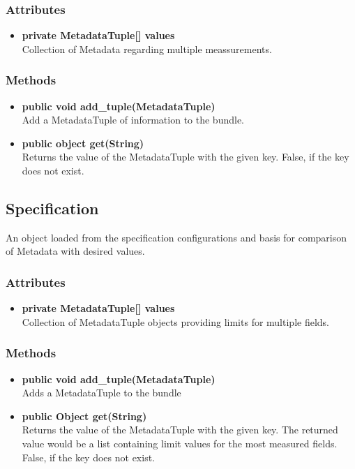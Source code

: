\subsubsection{Attributes}
\begin{itemize}
	\item \textbf{private MetadataTuple[] values}\\
	Collection of Metadata regarding multiple meassurements.
\end{itemize}
\subsubsection{Methods}
\begin{itemize}
	\item \textbf{public void add\_tuple(MetadataTuple)}\\
	Add a MetadataTuple of information to the bundle.
	\item \textbf{public object get(String)}\\
	Returns the value of the MetadataTuple with the given key. False, if the key does not exist.
\end{itemize}


\subsection{Specification}
An object loaded from the specification configurations and basis for comparison of Metadata with desired values.

\subsubsection{Attributes}
\begin{itemize}
	\item \textbf{private MetadataTuple[] values}\\
	Collection of MetadataTuple objects providing limits for multiple fields.
\end{itemize}
\subsubsection{Methods}
\begin{itemize}
	\item \textbf{public void add\_tuple(MetadataTuple)}\\
	Adds a MetadataTuple to the bundle
	\item \textbf{public Object get(String)}\\
	Returns the value of the MetadataTuple with the given key. The returned value would be a list containing limit values for the most measured fields. False, if the key does not exist.
\end{itemize}



